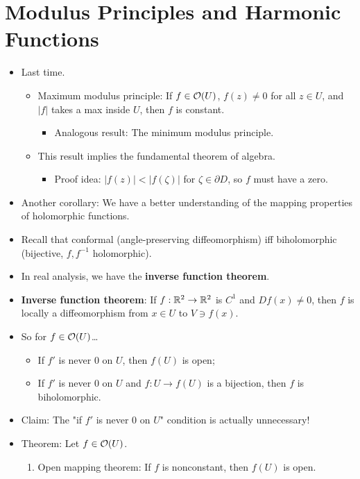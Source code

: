 \documentclass[../notes.tex]{subfiles}
\begin{document}
\section{Modulus Principles and Harmonic Functions}
\begin{itemize}
    \item {}Last time.
    \begin{itemize}
        \item Maximum modulus principle: If $f\in\mathcal{O}(U)$, $f(z)\neq 0$ for all $z\in U$, and $|f|$ takes a max inside $U$, then $f$ is constant.
        \begin{itemize}
            \item Analogous result: The minimum modulus principle.
        \end{itemize}
        \item This result implies the fundamental theorem of algebra.
        \begin{itemize}
            \item Proof idea: $|f(z)|<|f(\zeta)|$ for $\zeta\in\partial D$, so $f$ must have a zero.
        \end{itemize}
    \end{itemize}
    \item Another corollary: We have a better understanding of the mapping properties of holomorphic functions.
    \item Recall that conformal (angle-preserving diffeomorphism) iff biholomorphic (bijective, $f,f^{-1}$ holomorphic).
    \item In real analysis, we have the \textbf{inverse function theorem}.
    \item \textbf{Inverse function theorem}: If $f:\mathbb{R}^2\to\mathbb{R}^2$ is $C^1$ and $Df(x)\neq 0$, then $f$ is locally a diffeomorphism from $x\in U$ to $V\ni f(x)$.
    \item So for $f\in\mathcal{O}(U)$\dots
    \begin{itemize}
        \item If $f'$ is never 0 on $U$, then $f(U)$ is open;
        \item If $f'$ is never 0 on $U$ and $f:U\to f(U)$ is a bijection, then $f$ is biholomorphic.
    \end{itemize}
    \item Claim: The "if $f'$ is never 0 on $U$" condition is actually unnecessary!
    \item Theorem: Let $f\in\mathcal{O}(U)$.
    \begin{enumerate}
        \item Open mapping theorem: If $f$ is nonconstant, then $f(U)$ is open.

\end{enumerate}
\end{itemize}
\end{document}
